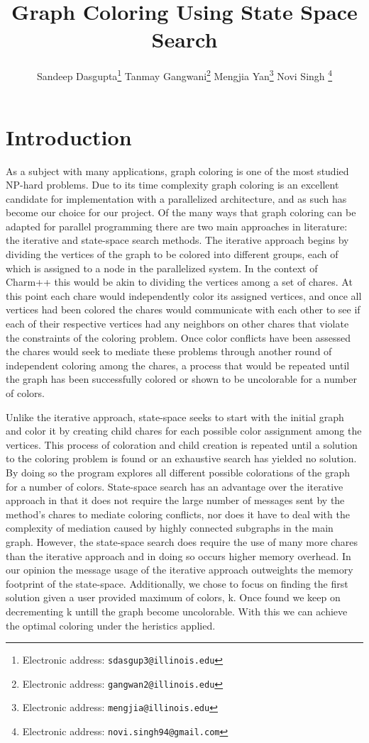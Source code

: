 \documentclass[10pt,twoside]{article}
\title{\textbf{Graph Coloring Using State Space Search}}
\author{Sandeep Dasgupta\thanks{Electronic address: \texttt{sdasgup3@illinois.edu}}
\qquad Tanmay Gangwani\thanks{Electronic address: \texttt{gangwan2@illinois.edu}}
\qquad Mengjia Yan\thanks{Electronic address: \texttt{mengjia@illinois.edu}}
\qquad  Novi Singh \thanks{Electronic address: \texttt{novi.singh94@gmail.com}}}
\begin{document}
\thispagestyle{empty}

\maketitle
\section{Introduction}
As a subject with many applications, graph coloring is one of the most studied
  NP-hard problems. Due to its time complexity graph coloring is an excellent
  candidate for implementation with a parallelized architecture, and as such
  has become our choice for our project. Of the many ways that graph coloring
  can be adapted for parallel programming there are two main approaches in
  literature: the iterative and state-space search methods.  The iterative
  approach begins by dividing the vertices of the graph to be colored into
  different groups, each of which is assigned to a node in the parallelized
  system. In the context of Charm++ this would be akin to dividing the vertices
  among a set of chares. At this point each chare would independently color its
  assigned vertices, and once all vertices had been colored the chares would
  communicate with each other to see if each of their respective vertices had
  any neighbors on other chares that violate the constraints of the coloring
  problem. Once color conflicts have been assessed the chares would seek to
  mediate these problems through another round of independent coloring among
  the chares, a process that would be repeated until the graph has been
  successfully colored or shown to be uncolorable for a number of colors. 

  Unlike the iterative approach, state-space seeks to start with the initial
  graph and color it by creating child chares for each possible color
  assignment among the vertices. This process of coloration and child creation
  is repeated until a solution to the coloring problem is found or an
  exhaustive search has yielded no solution. By doing so the program explores
  all different possible colorations of the graph for a number of colors.
  State-space search has an advantage over the iterative approach in that it
  does not require the large number of messages sent by the method’s chares to
  mediate coloring conflicts, nor does it have to deal with the complexity of
  mediation caused by highly connected subgraphs in the main graph. However,
            the state-space search does require the use of many more chares
              than the iterative approach and in doing so occurs higher memory
              overhead. In our opinion the message usage of the iterative
              approach outweights the memory footprint of the state-space.
              Additionally, we chose to focus on finding the first solution
              given a user provided maximum of  colors, k. Once found we keep on
              decrementing k untill the graph become uncolorable. With this
              we can achieve the optimal  coloring under the heristics applied.
              
\end{document}
